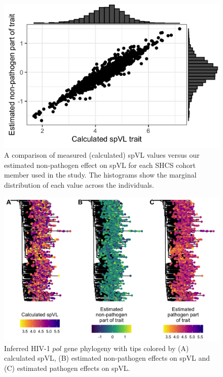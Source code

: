 \documentclass[]{article}
\begin{document}
\begin{doublespace}
\begin{figure}[H]
\begin{center}
\includegraphics[width = 0.462\linewidth]{figures/trait_values.png}
	\caption{A comparison of measured (calculated) spVL values versus our estimated non-pathogen effect on spVL for each SHCS cohort member used in the study. The histograms show the marginal distribution of each value across the individuals.}
	\label{fig:trait-comparison}
	\end{center}
\end{figure}

\begin{figure}[H]
\begin{center}
\includegraphics[width = \linewidth]{figures/spvl_on_tree.png}
	\caption{Inferred HIV-1 $pol$ gene phylogeny with tips colored by (A) calculated spVL, (B) estimated non-pathogen effects on spVL and (C) estimated pathogen effects on spVL.}
	\label{fig:spvl-on-tree}
	\end{center}
\end{figure}


\end{doublespace}
\end{document}
